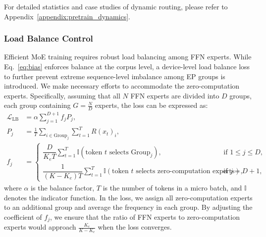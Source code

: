 \documentclass{article}
\newcommand{\kmax}{K}
\begin{document}
For detailed statistics and case studies of dynamic routing, please refer to Appendix~\ref{appendix:pretrain_dynamics}.

\subsubsection{Load Balance Control}
Efficient MoE training requires robust load balancing among FFN experts. While Eq.~\eqref{eq:bias} enforces balance at the corpus level, a device-level load balance loss \citep{deepseekai2025deepseekv3technicalreport} to further prevent extreme sequence-level imbalance among EP groups is introduced. We make necessary efforts to accommodate the zero-computation experts. Specifically, assuming that all $N$ FFN experts are divided into $D$ groups, each group containing $G=\frac{N}{D}$ experts, the loss can be expressed as:
\begin{align}
    \mathcal{L}_{\text{LB}} &= \alpha \sum_{j=1}^{D+1} f_j P_j, \label{eq:loss_lb}\\
    P_j &= \frac{1}{T} \sum_{i \in \text{Group}_j}\sum_{t=1}^T R(x_t)_i, \label{eq:pj}\\
    f_j &= \begin{cases}
        \dfrac{D}{K_e T}\displaystyle\sum_{t=1}^T \mathbb{I}(\text{token } t \text{ selects Group}_j), & \text{if } 1 \leq j \leq D, \\[3mm]
        \dfrac{1}{(K-K_e)T}\displaystyle\sum_{t=1}^T \mathbb{I}(\text{token } t \text{ selects zero-computation experts}), & \text{if } j = D+1,
    \end{cases} \label{eq:fj}
\end{align}
where $\alpha$ is the balance factor, $T$ is the number of tokens in a micro batch, and $\mathbb{I}$ denotes the indicator function. In the loss, we assign all zero-computation experts to an additional group and average the frequency in each group. By adjusting the coefficient of $f_j$, we ensure that the ratio of FFN experts to zero-computation experts would approach $\frac{K_e}{\kmax-K_e}$ when the loss converges.
\end{document}
